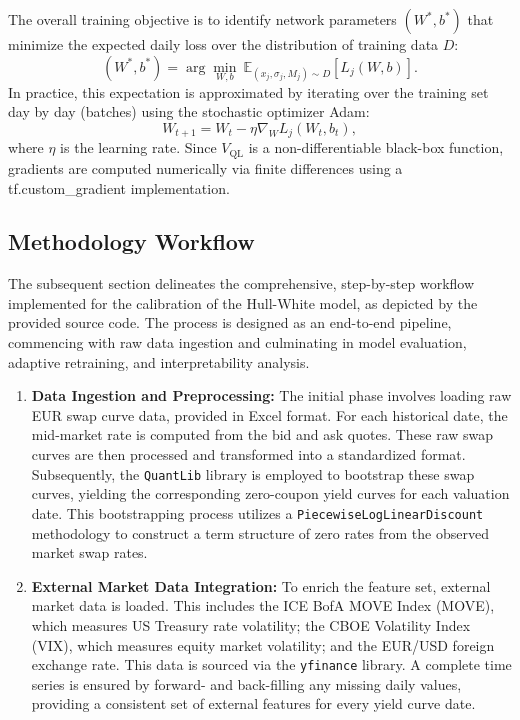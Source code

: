 {The overall training objective is to identify network parameters $(W^*, b^*)$ that minimize the expected daily loss over the distribution of training data $D$:
\begin{equation}
	(W^*, b^*) = \arg \min_{W, b} \ \mathbb{E}_{(x_j, \sigma_j, M_j) \sim D} \left[ L_j(W, b) \right].
\end{equation}
In practice, this expectation is approximated by iterating over the training set day by day (batches) using the stochastic optimizer Adam:
\begin{equation}
	W_{t+1} = W_t - \eta \nabla_W L_j(W_t, b_t),
\end{equation}
where $\eta$ is the learning rate. Since $V_{\text{QL}}$ is a non-differentiable black-box function, gradients are computed numerically via finite differences using a tf.custom\_gradient implementation.

\subsection{Methodology Workflow}
The subsequent section delineates the comprehensive, step-by-step workflow implemented for the calibration of the Hull-White model, as depicted by the provided source code. The process is designed as an end-to-end pipeline, commencing with raw data ingestion and culminating in model evaluation, adaptive retraining, and interpretability analysis.

\begin{enumerate}
	\item \textbf{Data Ingestion and Preprocessing:}
	      The initial phase involves loading raw EUR swap curve data, provided in Excel format. For each historical date, the mid-market rate is computed from the bid and ask quotes. These raw swap curves are then processed and transformed into a standardized format. Subsequently, the \texttt{QuantLib} library is employed to bootstrap these swap curves, yielding the corresponding zero-coupon yield curves for each valuation date. This bootstrapping process utilizes a \texttt{PiecewiseLogLinearDiscount} methodology to construct a term structure of zero rates from the observed market swap rates.

	\item \textbf{External Market Data Integration:}
	      To enrich the feature set, external market data is loaded. This includes the ICE BofA MOVE Index (MOVE), which measures US Treasury rate volatility; the CBOE Volatility Index (VIX), which measures equity market volatility; and the EUR/USD foreign exchange rate. This data is sourced via the \texttt{yfinance} library. A complete time series is ensured by forward- and back-filling any missing daily values, providing a consistent set of external features for every yield curve date.


\end{enumerate}}
